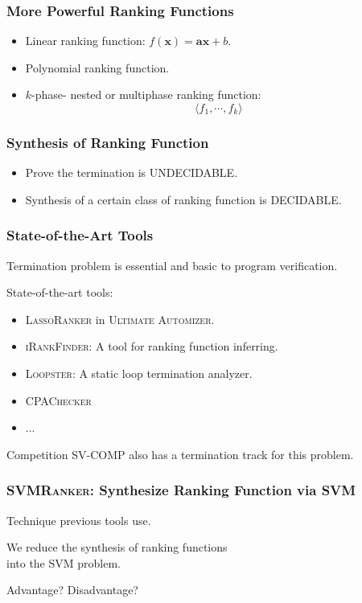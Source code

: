 \documentclass[11pt]{beamer}
\begin{document}
\begin{frame}\frametitle{More Powerful Ranking Functions}
\begin{itemize}
\item Linear ranking function: $f(\mathbf{x}) = \mathbf{ax} + b$.
\item Polynomial ranking function.
\item $k$-phase- nested or multiphase ranking function:
\[\langle f_1, \cdots, f_k\rangle\]
\end{itemize}

\end{frame}

\begin{frame}\frametitle{Synthesis of Ranking Function}

\begin{itemize}
\item Prove the termination is UNDECIDABLE.
\item Synthesis of a certain class of ranking function is DECIDABLE.
\end{itemize}

\end{frame}

\begin{frame}\frametitle{State-of-the-Art Tools}
Termination problem is essential and basic to program verification.

State-of-the-art tools:
\begin{itemize}
\item \textsc{LassoRanker} in \textsc{Ultimate Automizer}.
\item \textsc{iRankFinder}: A tool for ranking function inferring.
\item \textsc{Loopster}: A static loop termination analyzer.
\item \textsc{CPAChecker}
\item ...
\end{itemize}
Competition \textsc{SV-COMP} also has a termination track for this problem.

\end{frame}



\begin{frame}\frametitle{\textsc{SVMRanker}: Synthesize Ranking Function via SVM}
\begin{center}

Technique previous tools use.
\end{center}

\begin{center}
We reduce the synthesis of ranking functions
\\ into the SVM problem.
\end{center}

\begin{center}
Advantage? Disadvantage?
\end{center}


\end{frame}
\end{document}

